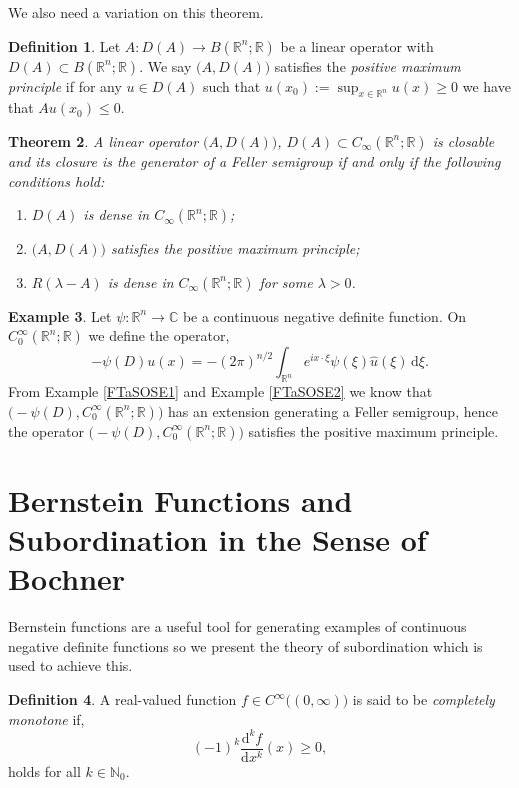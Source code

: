 \documentclass[a4paper, 12pt]{report}
\newtheorem{theorem}{Theorem}[section]
\theoremstyle{cor}
\theoremstyle{remark}
\theoremstyle{definition}
\newtheorem{defn}[theorem]{Definition}
\newtheorem{eg}[theorem]{Example}
\begin{document}
We also need a variation on this theorem.

\begin{defn}
Let $A : D(A) \to B(\mathbb{R}^n; \mathbb{R})$ be a linear operator with $D(A) \subset B(\mathbb{R}^n; \mathbb{R})$.  We say $\big(A, D(A)\big)$ satisfies the \emph{positive maximum principle} if for any $u \in D(A)$ such that $u(x_0) := \sup_{x \in \mathbb{R}^n}u(x) \ge 0$ we have that $Au(x_0) \le 0$.
\end{defn}

\begin{theorem}
A linear operator $\big(A, D(A)\big)$, $D(A) \subset C_\infty(\mathbb{R}^n; \mathbb{R})$ is closable and its closure is the generator of a Feller semigroup if and only if the following conditions hold:
\begin{enumerate}
\item $D(A)$ is dense in $C_\infty(\mathbb{R}^n; \mathbb{R})$;

\item $\big(A, D(A)\big)$ satisfies the positive maximum principle;

\item $R(\lambda - A)$ is dense in $C_\infty(\mathbb{R}^n; \mathbb{R})$ for some $\lambda > 0$.
\end{enumerate}
\end{theorem}

\begin{eg}
Let $\psi : \mathbb{R}^n \to \mathbb{C}$ be a continuous negative definite function.  On $C_0^\infty(\mathbb{R}^n; \mathbb{R})$ we define the operator,
$$
-\psi(D)u(x) = -(2\pi)^{n/2}\int_{\mathbb{R}^n}e^{ix\cdot\xi}\psi(\xi)\hat{u}(\xi)\,\mathrm{d}\xi.
$$
From Example \ref{FTaSOSE1} and Example \ref{FTaSOSE2} we know that $\big(-\psi(D), C_0^\infty(\mathbb{R}^n; \mathbb{R})\big)$ has an extension generating a Feller semigroup, hence the operator $\big(-\psi(D), C_0^\infty(\mathbb{R}^n; \mathbb{R})\big)$ satisfies the positive maximum principle.
\end{eg}


\section{Bernstein Functions and Subordination in the Sense of Bochner}\label{BFaSitSoB}

Bernstein functions are a useful tool for generating examples of continuous negative definite functions so we present the theory of subordination which is used to achieve this.
\begin{defn}
A real-valued function $f \in C^\infty\big((0, \infty)\big)$ is said to be \emph{completely monotone} if,
\begin{equation}
(-1)^k\frac{\mathrm{d}^kf}{\mathrm{d}x^k}(x) \ge 0,
\end{equation}
holds for all $k \in \mathbb{N}_0$.
\end{defn}
\end{document}
